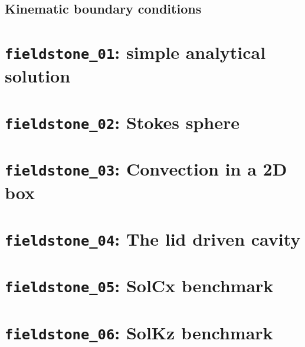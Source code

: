 \documentclass[a4paper]{article}
\begin{document}
\subsection{Kinematic boundary conditions}  %






\newpage
\section{{\tt fieldstone\_01}: simple analytical solution \label{f01}}


\newpage
\section{{\tt fieldstone\_02}: Stokes sphere \label{f02}}


\newpage
\section{{\tt fieldstone\_03}: Convection in a 2D box \label{f03}}


\newpage
\section{{\tt fieldstone\_04}: The lid driven cavity \label{f04}}



\newpage
\section{{\tt fieldstone\_05}: SolCx benchmark \label{f05}}


\newpage
\section{{\tt fieldstone\_06}: SolKz benchmark \label{f06}}

\end{document}
